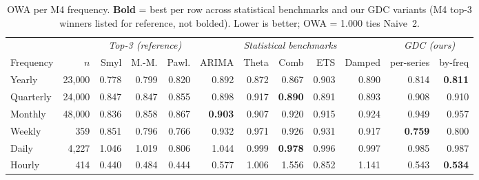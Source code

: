 %
\begin{table}[t]
\centering
\caption{OWA per M4 frequency. \textbf{Bold} = best per row across statistical benchmarks and our GDC variants (M4 top-3 winners listed for reference, not bolded). Lower is better; OWA = 1.000 ties Naive~2.}
\label{tab:m4_per_frequency}
\small
\begin{tabular}{l r | r r r | r r r r r | r r}
\toprule
& & \multicolumn{3}{c|}{\emph{Top-3 (reference)}}
& \multicolumn{5}{c|}{\emph{Statistical benchmarks}}
& \multicolumn{2}{c}{\emph{GDC (ours)}} \\
\cmidrule(lr){3-5} \cmidrule(lr){6-10} \cmidrule(lr){11-12}
Frequency & $n$
& Smyl & M.-M. & Pawl.
& ARIMA & Theta & Comb & ETS & Damped
& per-series & by-freq \\
\midrule
Yearly     & 23{,}000 & 0.778 & 0.799 & 0.820 & 0.892 & 0.872 & 0.867 & 0.903 & 0.890 & 0.814 & \textbf{0.811} \\
Quarterly  & 24{,}000 & 0.847 & 0.847 & 0.855 & 0.898 & 0.917 & \textbf{0.890} & 0.891 & 0.893 & 0.908 & 0.910 \\
Monthly    & 48{,}000 & 0.836 & 0.858 & 0.867 & \textbf{0.903} & 0.907 & 0.920 & 0.915 & 0.924 & 0.949 & 0.957 \\
Weekly     &     359  & 0.851 & 0.796 & 0.766 & 0.932 & 0.971 & 0.926 & 0.931 & 0.917 & \textbf{0.759} & 0.800 \\
Daily      &  4{,}227 & 1.046 & 1.019 & 0.806 & 1.044 & 0.999 & \textbf{0.978} & 0.996 & 0.997 & 0.985 & 0.987 \\
Hourly     &     414  & 0.440 & 0.484 & 0.444 & 0.577 & 1.006 & 1.556 & 0.852 & 1.141 & 0.543 & \textbf{0.534} \\
\bottomrule
\end{tabular}
\end{table}
